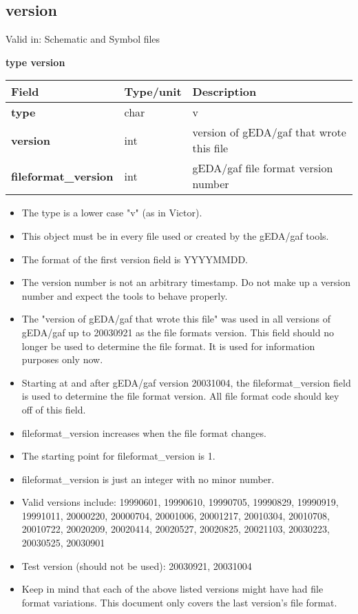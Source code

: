 \documentclass{article}
\begin{document}
\subsection{version}

Valid in: Schematic and Symbol files

{\bf type version}

\begin{table}[h]
\begin{tabular}{|l|l|l|} \hline
Field 		& Type/unit 	& Description \\ \hline 
\hline
{\bf type} 	& char 		& v \\ \hline
{\bf version} 	& int 		& version of gEDA/gaf that wrote this file \\ \hline
{\bf fileformat\_version} 	& int 		& gEDA/gaf file format version number \\ \hline
\end{tabular}
\end{table}

\begin{itemize}
\item The type is a lower case "v" (as in Victor).
\item This object must be in every file used or created by the gEDA/gaf tools.
\item The format of the first version field is YYYYMMDD.  
\item The version number is not an arbitrary timestamp.  Do not make up a 
      version number and expect the tools to behave properly.  
\item The "version of gEDA/gaf that wrote this file" was used in all versions of gEDA/gaf up to 20030921 as the file formats version.  This field should no longer be used to determine the file format.  It is used for information purposes only now. 
\item Starting at and after gEDA/gaf version 20031004, the fileformat\_version field is used to determine the file format version.  All file format code should key off of this field.
\item fileformat\_version increases when the file format changes.
\item The starting point for fileformat\_version is 1.
\item fileformat\_version is just an integer with no minor number.

\item Valid versions include: 
19990601, 19990610, 19990705, 19990829, 19990919, 19991011, 20000220, 20000704,
20001006, 20001217, 20010304, 20010708, 20010722, 20020209, 20020414, 20020527,
20020825, 20021103, 20030223, 20030525, 20030901

\item Test version (should not be used): 
20030921, 20031004

\item Keep in mind that each of the above listed versions might have had 
file format variations.  This document only covers the last version's file 
format.

\end{itemize}
\end{document}
